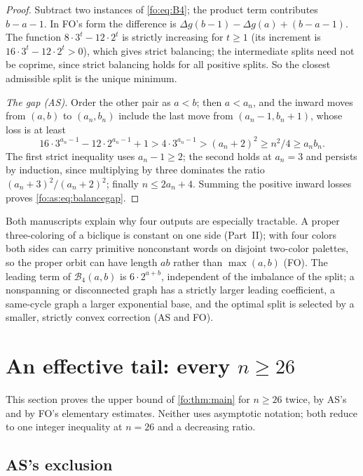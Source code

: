 \documentclass[11pt,a4paper]{article}
\numberwithin{equation}{section}
\theoremstyle{definition}
\theoremstyle{remark}
\newcommand{\Bip}{\mathcal B}
\begin{document}
\begin{proof}
Subtract two instances of \eqref{fo:eq:B4}; the product term contributes
$b-a-1$. In FO's form the difference is $\Delta g(b-1)-\Delta g(a)+(b-a-1)$.
The function $8\cdot3^t-12\cdot2^t$ is strictly increasing for $t\ge1$ (its
increment is $16\cdot3^t-12\cdot2^t>0$), which gives strict balancing; the
intermediate splits need not be coprime, since strict balancing holds for
all positive splits. So the closest admissible split is the unique minimum.

\emph{The gap (AS).} Order the other pair as $a<b$; then $a<a_n$, and the
inward moves from $(a,b)$ to $(a_n,b_n)$ include the last move from
$(a_n-1,b_n+1)$, whose loss is at least
\[
 16\cdot3^{a_n-1}-12\cdot2^{a_n-1}+1>4\cdot3^{a_n-1}>(a_n+2)^2\ge n^2/4\ge a_nb_n.
\]
The first strict inequality uses $a_n-1\ge2$; the second holds at $a_n=3$ and
persists by induction, since multiplying by three dominates the ratio
$(a_n+3)^2/(a_n+2)^2$; finally $n\le2a_n+4$. Summing the positive inward
losses proves \eqref{fo:as:eq:balancegap}.
\end{proof}

Both manuscripts explain why four outputs are especially tractable. A proper
three-coloring of a biclique is constant on one side (Part~II); with four
colors both sides can carry primitive nonconstant words on disjoint two-color
palettes, so the proper orbit can have length $ab$ rather than $\max(a,b)$
(FO). The leading term of $\Bip_4(a,b)$ is $6\cdot2^{a+b}$, independent of the
imbalance of the split; a nonspanning or disconnected graph has a strictly
larger leading coefficient, a same-cycle graph a larger exponential base, and
the optimal split is selected by a smaller, strictly convex correction (AS
and FO).

\section{An effective tail: every \texorpdfstring{$n\ge26$}{n >= 26}}\label{fo:sec:tail}

This section proves the upper bound of \cref{fo:thm:main} for $n\ge26$ twice,
by AS's and by FO's elementary estimates. Neither uses asymptotic notation;
both reduce to one integer inequality at $n=26$ and a decreasing ratio.

\subsection{AS's exclusion}
\end{document}

